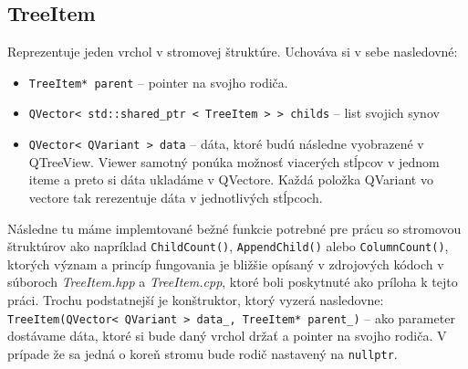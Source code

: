 \subsection{TreeItem}
\label{kap04:sec:tree_item}
Reprezentuje jeden vrchol v stromovej štruktúre. Uchováva si v sebe nasledovné:
\begin{itemize}
\item \texttt{TreeItem* parent} -- pointer na svojho rodiča.
\item \texttt{QVector\textless~std::shared\_ptr~\textless~TreeItem~\textgreater~\textgreater~childs} -- list svojich synov
\item \texttt{QVector\textless~QVariant~\textgreater~data} -- dáta, ktoré budú následne vyobrazené v QTreeView. Viewer samotný ponúka možnosť viacerých stĺpcov v jednom iteme a preto si dáta ukladáme v QVectore. Každá položka QVariant vo vectore tak rerezentuje dáta v jednotlivých stĺpcoch.
\end{itemize} 

Následne tu máme implemtované bežné funkcie potrebné pre prácu so stromovou štruktúrov ako napríklad \texttt{ChildCount()}, \texttt{AppendChild()} alebo \texttt{Column\-Count()}, ktorých význam a princíp fungovania je bližšie opísaný v zdrojových kódoch v súboroch \textit{TreeItem.hpp} a \textit{TreeItem.cpp}, ktoré boli poskytnuté ako príloha k tejto práci.
Trochu podstatnejší je konštruktor, ktorý vyzerá nasledovne:
\texttt{TreeItem(QVector\textless~QVariant~\textgreater~data\_, TreeItem* parent\_)} -- ako parameter dostávame dáta, ktoré si bude daný vrchol držať a pointer na svojho rodiča. V prípade že sa jedná o koreň stromu bude rodič nastavený na \texttt{nullptr}.



